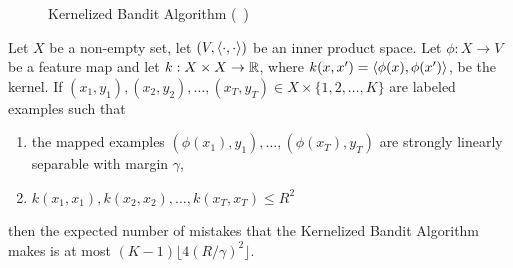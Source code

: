 \begin{figure}[bht!]
  
  \begin{algorithm}[H]
    \SetAlgoLined
    \DontPrintSemicolon
    \end{algorithm}
    \caption{Kernelized Bandit Algorithm (~\cite{BeygelzimerPSTWZ2019-separable})}
    \label{alg:kernel-bandit}
\end{figure}

\begin{theorem}
  Let $X$ be a non-empty set, let $(V,\langle \cdot,\cdot\rangle)$ be an
  inner product space.  Let $\phi:X\rightarrow V$ be a feature map and
  let $k:X\times X\rightarrow{\mathbb{R}}$, where
  $k(x,x')=\langle \phi(x),\phi(x')\rangle$, be the kernel.  If
  $(x_1,y_1),(x_2,y_2),\ldots,(x_T,y_T)\in X\times\{1,2,\ldots,K\}$
  are labeled examples such that
  \begin{enumerate}
  \item the mapped examples $(\phi(x_1),y_1),\ldots,(\phi(x_T),y_T)$
    are strongly linearly separable with margin $\gamma$,
  \item $k(x_1,x_1),k(x_2,x_2),\ldots,k(x_T,x_T)\leq R^2$
  \end{enumerate}
  then the expected number of mistakes that the {\sc Kernelized Bandit
    Algorithm} makes is at most $(K-1)\lfloor 4(R/\gamma)^2 \rfloor$.
  \label{thm:kernel-bandit-mistake-bound}
\end{theorem}

